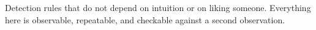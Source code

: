 
\begin{chapterblurb}
Detection rules that do not depend on intuition or on liking someone. Everything here is observable, repeatable, and checkable against a second observation.
\end{chapterblurb}
